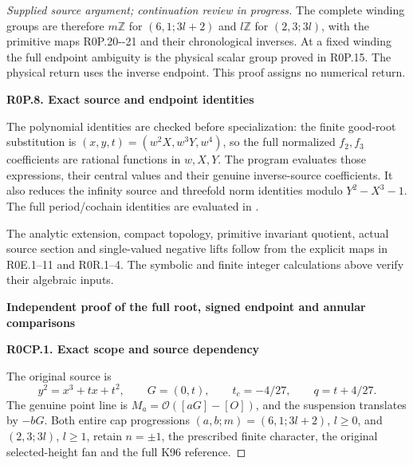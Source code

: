 \begin{proof}[Supplied source argument; continuation review in progress]
The complete winding groups are therefore
\(m\mathbb Z\) for \((6,1;3l+2)\) and
\(l\mathbb Z\) for \((2,3;3l)\), with the
primitive maps R0P.20-\/-21 and their chronological
inverses. At a fixed winding the full endpoint
ambiguity is the physical scalar group proved in
R0P.15. The physical return uses the inverse
endpoint. This proof assigns no numerical return.

\par

\medskip\noindent\textbf{R0P.8. Exact source and endpoint identities}

\par\nobreak

The polynomial identities are checked before specialization:
the finite good-root substitution is
$(x,y,t)=(w^2X,w^3Y,w^4)$, so the full normalized $f_2,f_3$ coefficients
are rational functions in $w,X,Y$. The program 
evaluates those expressions, their central values and their genuine
inverse-source coefficients. It also reduces the infinity source and
threefold norm identities modulo $Y^2-X^3-1$.
The full period/cochain identities are evaluated in .

The analytic extension, compact topology, primitive invariant
quotient, actual source section and single-valued negative lifts follow
from the explicit maps in R0E.1--11 and R0R.1--4. The symbolic and finite
integer calculations above verify their algebraic inputs.


\par\bigskip\noindent\textbf{Independent proof of the full root, signed endpoint and annular comparisons}\par\nobreak

\par

\medskip\noindent\textbf{R0CP.1. Exact scope and source dependency}

\par\nobreak

The original source is
\[
 y^2=x^3+tx+t^2,\qquad G=(0,t),\qquad
 t_c=-4/27,\qquad q=t+4/27.
\]
The genuine point line is \(M_a=\mathcal O([aG]-[O])\), and the
suspension translates by \(-bG\). Both entire cap progressions
\((a,b;m)=(6,1;3l+2)\), \(l\geq0\), and
\((2,3;3l)\), \(l\geq1\), retain \(n=\pm1\), the prescribed finite
character, the original selected-height fan and the full K96 reference.


\end{proof}
